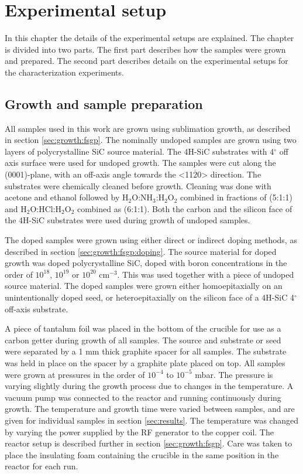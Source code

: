 
\chapter{Experimental setup}
\label{sec:experimental}
In this chapter the details of the experimental setups are explained. The chapter is divided into two parts. The first part describes how the samples were grown and prepared. The second part describes details on the experimental setups for the characterization experiments. 

\section{Growth and sample preparation}
\label{sec:experimental:samples}
All samples used in this work are grown using sublimation growth, as described in section \ref{sec:growth:fsgp}. The nominally undoped samples are grown using two layers of polycrystalline SiC source material. The 4H-SiC substrates with 4$^\circ$ off axis surface were used for undoped growth. The samples were cut along the (0001)-plane, with an off-axis angle towards the <11$\overline{2}$0> direction. The substrates were chemically cleaned before growth. Cleaning was done with acetone and ethanol followed by H$_2$O:NH$_3$:H$_2$O$_2$ combined in fractions of (5:1:1) and H$_2$O:HCl:H$_2$O$_2$ combined as (6:1:1). Both the carbon and the silicon face of the 4H-SiC substrates were used during growth of undoped samples. 

The doped samples were grown using either direct or indirect doping methods, as described in section \ref{sec:growth:fsgp:doping}. The source material for doped growth was doped polycrystalline SiC, doped with boron concentrations in the order of $10^{18}$, $10^{19}$ or $10^{20}$ cm$^{-3}$. This was used together with a piece of undoped source material. The doped samples were grown either homoepitaxially on an unintentionally doped seed, or heteroepitaxially on the silicon face of a 4H-SiC 4$^\circ$ off-axis substrate. 

A piece of tantalum foil was placed in the bottom of the crucible for use as a carbon getter during growth of all samples. The source and substrate or seed were separated by a 1 mm thick graphite spacer for all samples. The substrate was held in place on the spacer by a graphite plate placed on top. All samples were grown at pressures in the order of $10^{-4}$ to $10^{-5}$ mbar. The pressure is varying slightly during the growth process due to changes in the temperature. A vacuum pump was connected to the reactor and running continuously during growth. The temperature and growth time were varied between samples, and are given for individual samples in section \ref{sec:results}. The temperature was changed by varying the power supplied by the RF generator to the copper coil. The reactor setup is described further in section \ref{sec:growth:fsgp}. Care was taken to place the insulating foam containing the crucible in the same position in the reactor for each run. 

